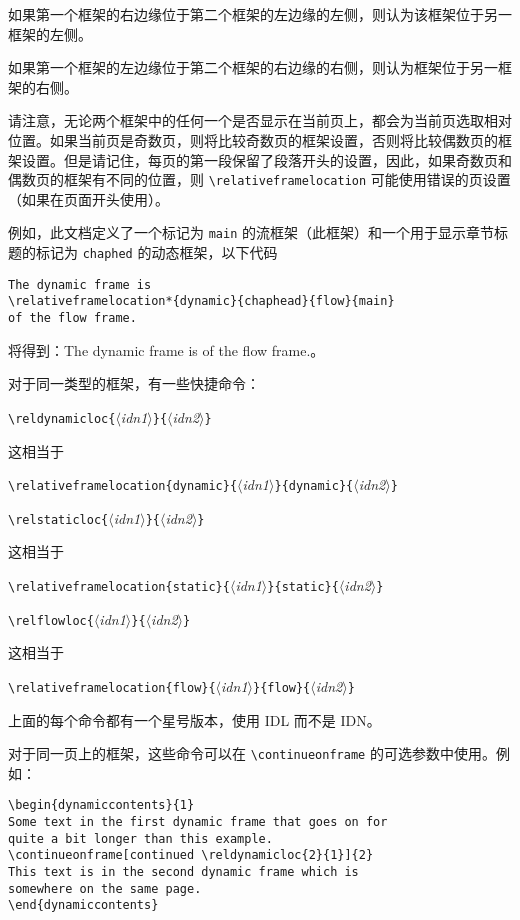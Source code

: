 \documentclass[a4paper]{book}%
\newcommand{\meta}[1]{\textnormal{\ensuremath{\langle}\makebox[0pt][l]{}\emph{#1}\makebox[0pt][l]{}\ensuremath{\rangle}}}
\newcommand{\cmd}[1]{\texttt{#1}}
\begin{document}
如果第一个框架的右边缘位于第二个框架的左边缘的左侧，则认为该框架位于另一框架的左侧。

如果第一个框架的左边缘位于第二个框架的右边缘的右侧，则认为框架位于另一框架的右侧。

请注意，无论两个框架中的任何一个是否显示在当前页上，都会为当前页选取相对位置。如果当前页是奇数页，则将比较奇数页的框架设置，否则将比较偶数页的框架设置。但是请记住，每页的第一段保留了段落开头的设置，因此，如果奇数页和偶数页的框架有不同的位置，则 \verb|\relativeframelocation| 可能使用错误的页设置（如果在页面开头使用）。

例如，此文档定义了一个标记为 \cmd{main} 的流框架（此框架）和一个用于显示章节标题的标记为 \cmd{chaphed} 的动态框架，以下代码
\newpage
\begin{lstlisting}[backgroundcolor=\color{white}]
The dynamic frame is
\relativeframelocation*{dynamic}{chaphead}{flow}{main}
of the flow frame.
\end{lstlisting}
将得到：The dynamic frame is  of the flow frame.。

对于同一类型的框架，有一些快捷命令：
\begin{mdframed}
    \verb|\reldynamicloc{|\meta{idn1}\verb|}{|\meta{idn2}\verb|}|
\end{mdframed}
这相当于
\begin{mdframed}[backgroundcolor=white]
    \verb|\relativeframelocation{dynamic}{|\meta{idn1}\verb|}{dynamic}{|\meta{idn2}\verb|}|
\end{mdframed}
\begin{mdframed}
    \verb|\relstaticloc{|\meta{idn1}\verb|}{|\meta{idn2}\verb|}|
\end{mdframed}
这相当于
\begin{mdframed}[backgroundcolor=white]
    \verb|\relativeframelocation{static}{|\meta{idn1}\verb|}{static}{|\meta{idn2}\verb|}|
\end{mdframed}
\begin{mdframed}
    \verb|\relflowloc{|\meta{idn1}\verb|}{|\meta{idn2}\verb|}|
\end{mdframed}
这相当于
\begin{mdframed}[backgroundcolor=white]
    \verb|\relativeframelocation{flow}{|\meta{idn1}\verb|}{flow}{|\meta{idn2}\verb|}|
\end{mdframed}
上面的每个命令都有一个星号版本，使用 IDL 而不是 IDN。

对于同一页上的框架，这些命令可以在 \verb|\continueonframe| 的可选参数中使用。例如：
\begin{lstlisting}[backgroundcolor=\color{white}]
\begin{dynamiccontents}{1}
Some text in the first dynamic frame that goes on for
quite a bit longer than this example.
\continueonframe[continued \reldynamicloc{2}{1}]{2}
This text is in the second dynamic frame which is
somewhere on the same page.
\end{dynamiccontents}
\end{lstlisting}
\end{document}
